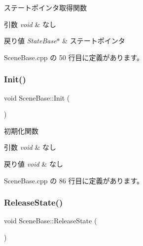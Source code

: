 ステートポインタ取得関数 


\begin{DoxyParams}{引数}
{\em void} & なし \\
\hline
\end{DoxyParams}

\begin{DoxyRetVals}{戻り値}
{\em State\+Base$\ast$} & ステートポインタ \\
\hline
\end{DoxyRetVals}


 Scene\+Base.\+cpp の 50 行目に定義があります。

\mbox{\label{class_scene_base_a494ba624fdd95b296e4487ed1a34f47b}} 
\subsubsection{\texorpdfstring{Init()}{Init()}}
{\footnotesize\ttfamily void Scene\+Base\+::\+Init (\begin{DoxyParamCaption}{ }\end{DoxyParamCaption})}



初期化関数 


\begin{DoxyParams}{引数}
{\em void} & なし \\
\hline
\end{DoxyParams}

\begin{DoxyRetVals}{戻り値}
{\em void} & なし \\
\hline
\end{DoxyRetVals}


 Scene\+Base.\+cpp の 86 行目に定義があります。

\mbox{\label{class_scene_base_aaa1e66fbfc6740b069d715b325915b97}} 
\subsubsection{\texorpdfstring{Release\+State()}{ReleaseState()}}
{\footnotesize\ttfamily void Scene\+Base\+::\+Release\+State (\begin{DoxyParamCaption}{ }\end{DoxyParamCaption})}



